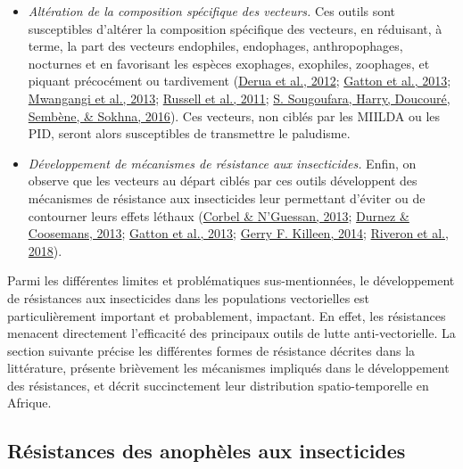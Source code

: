 \documentclass[12pt,twoside]{reedthesis}
\begin{document}
\begin{itemize}
\item
  \emph{Altération de la composition spécifique des vecteurs.} Ces outils sont susceptibles d'altérer la composition spécifique des vecteurs, en réduisant, à terme, la part des vecteurs endophiles, endophages, anthropophages, nocturnes et en favorisant les espèces exophages, exophiles, zoophages, et piquant précocément ou tardivement (\protect\hyperlink{ref-derua_change_2012}{Derua et al., 2012}; \protect\hyperlink{ref-gatton_importance_2013}{Gatton et al., 2013}; \protect\hyperlink{ref-mwangangi_shifts_2013}{Mwangangi et al., 2013}; \protect\hyperlink{ref-russell_increased_2011}{Russell et al., 2011}; \protect\hyperlink{ref-sougoufara_shift_2016}{S. Sougoufara, Harry, Doucouré, Sembène, \& Sokhna, 2016}). Ces vecteurs, non ciblés par les MIILDA ou les PID, seront alors susceptibles de transmettre le paludisme.
\item
  \emph{Développement de mécanismes de résistance aux insecticides.} Enfin, on observe que les vecteurs au départ ciblés par ces outils développent des mécanismes de résistance aux insecticides leur permettant d'éviter ou de contourner leurs effets léthaux (\protect\hyperlink{ref-corbel_distribution_2013}{Corbel \& N'Guessan, 2013}; \protect\hyperlink{ref-manguin_residual_2013}{Durnez \& Coosemans, 2013}; \protect\hyperlink{ref-gatton_importance_2013}{Gatton et al., 2013}; \protect\hyperlink{ref-killeen_characterizing_2014}{Gerry F. Killeen, 2014}; \protect\hyperlink{ref-riveron_insecticide_2018}{Riveron et al., 2018}).
\end{itemize}
Parmi les différentes limites et problématiques sus-mentionnées, le développement de résistances aux insecticides dans les populations vectorielles est particulièrement important et probablement, impactant. En effet, les résistances menacent directement l'efficacité des principaux outils de lutte anti-vectorielle. La section suivante précise les différentes formes de résistance décrites dans la littérature, présente brièvement les mécanismes impliqués dans le développement des résistances, et décrit succinctement leur distribution spatio-temporelle en Afrique.

\hypertarget{ruxe9sistances-des-anophuxe8les-aux-insecticides}{%
\subsection{Résistances des anophèles aux insecticides}\label{ruxe9sistances-des-anophuxe8les-aux-insecticides}}
\end{document}
